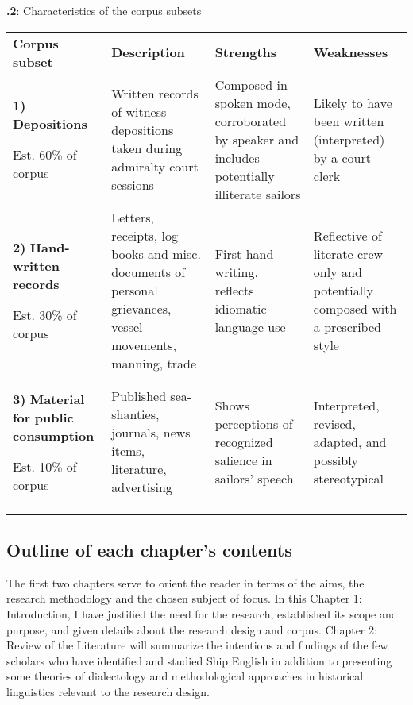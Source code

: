 \textbf{.2}: Characteristics of the corpus subsets 


\begin{tabularx}{\textwidth}{XXXX}
\lsptoprule

\textbf{Corpus} \textbf{subset} & \textbf{Description} & \textbf{Strengths} & \textbf{Weaknesses}\\
\textbf{1)} \textbf{Depositions}

Est. 60\% of corpus & Written records of witness depositions taken during admiralty court sessions & Composed in spoken mode, corroborated by speaker and includes potentially illiterate sailors & Likely to have been written (interpreted) by a court clerk\\
\textbf{2)} \textbf{Hand-written} \textbf{records}

Est. 30\% of corpus & Letters, receipts, log books and misc. documents of personal grievances, vessel movements, manning, trade & First-hand writing, reflects idiomatic language use & Reflective of literate crew only and potentially composed with a prescribed style\\
\textbf{3)} \textbf{Material} \textbf{for} \textbf{public} \textbf{consumption}

Est. 10\% of corpus & Published sea-shanties, journals, news items, literature, advertising & Shows perceptions of recognized salience in sailors’ speech & Interpreted, revised, adapted, and possibly stereotypical \\
\lspbottomrule
\end{tabularx}

\subsection{\textbf{Outline} \textbf{of} \textbf{each} \textbf{chapter’s} \textbf{contents}}%



  The first two chapters serve to orient the reader in terms of the aims, the research methodology and the chosen subject of focus. In this Chapter 1: Introduction, I have justified the need for the research, established its scope and purpose, and given details about the research design and corpus. Chapter 2: Review of the Literature will summarize the intentions and findings of the few scholars who have identified and studied Ship English in addition to presenting some theories of dialectology and methodological approaches in historical linguistics relevant to the research design. 



